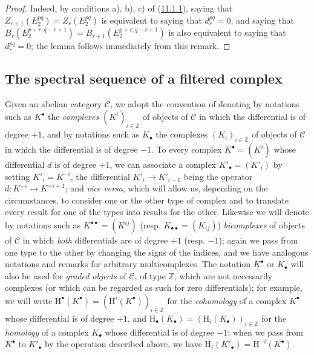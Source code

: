 \begin{proof}
Indeed, by conditions a), b), c) of
(\hyperref[0.11.1.1]{11.1.1}), saying that
$Z_{r+1}(E_2^{pq})=Z_r(E_2^{pq})$ is equivalent to saying that $d_r^{pq}=0$, and saying
that
$B_r(E_2^{p+r,q-r+1})=B_{r+1}(E_2^{p+r,q-r+1})$ is also equivalent to saying that
$d_r^{pq}=0$; the lemma follows immediately from this remark.
\end{proof}
\subsection{The spectral sequence of a filtered complex}
\label{subsection:0.11.2}

\begin{env}[11.2.1]
\label{0.11.2.1}
Given an abelian category $\mathcal C$, we adopt the convention of
denoting by notations such as $K^\bullet$ the \emph{complexes}
$(K^i)_{i\in\mathbb Z}$ of objects of $\mathcal C$ in which the
differential is of degree $+1$, and by notations such as $K_\bullet$ the
complexes $(K_i)_{i\in\mathbb Z}$ of objects of $\mathcal C$ in which
the differential is of degree $-1$. To every complex
$K^\bullet=(K^i)$ whose differential $d$ is of degree $+1$, we
can associate a complex $K'_\bullet=(K'_i)$ by setting $K'_i=K^{-i}$,
the differential $K'_i\to K'_{i-1}$ being the operator
$d:K^{-i}\to K^{-i+1}$; and \emph{vice versa}, which will allow us, depending
on the circumstances, to consider one or the other type of complex and to
translate every result for one of the types into results for the other. Likewise
we will denote by notations such as $K^{\bullet\bullet}=(K^{ij})$ (resp.
$K_{\bullet\bullet}=(K_{ij})$) \emph{bicomplexes} of objects of
$\mathcal C$ in which \emph{both} differentials are of
degree $+1$ (resp. $-1$); again we pass from one type to the other by changing
the signs of the indices, and we have analogous notations and remarks for
arbitrary multicomplexes. The notation $K^\bullet$ or $K_\bullet$ will also be
used for \emph{graded objects} of $\mathcal C$, of type $\mathbb Z$,
which are not necessarily complexes (or which can be regarded
as such for zero differentials); for example, we will
write
$\mathrm H^\bullet(K^\bullet)=(\mathrm H^i(K^\bullet))_{i\in\mathbb Z}$ for the
\emph{cohomology} of a complex $K^\bullet$ whose differential
is of degree $+1$, and
$\mathrm H_\bullet(K_\bullet)=(\mathrm H_i(K_\bullet))_{i\in\mathbb Z}$ for
the \emph{homology} of a complex $K_\bullet$ whose differential
is of degree $-1$; when we pass from $K^\bullet$ to $K'_\bullet$ by
the operation described above, we have
$\mathrm H_i(K'_\bullet)=\mathrm H^{-i}(K^\bullet)$.


\end{env}
